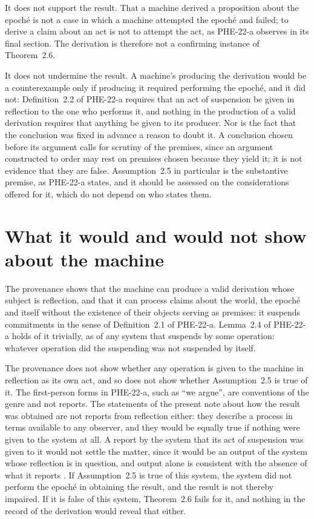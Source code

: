 \documentclass{situationist-preprint}
\begin{document}
It does not support the result. That a machine derived a proposition about the epoché is not a case in which a machine attempted the epoché and failed; to derive a claim about an act is not to attempt the act, as PHE-22-a observes in its final section. The derivation is therefore not a confirming instance of Theorem~2.6.

It does not undermine the result. A machine's producing the derivation would be a counterexample only if producing it required performing the epoché, and it did not: Definition~2.2 of PHE-22-a requires that an act of suspension be given in reflection to the one who performs it, and nothing in the production of a valid derivation requires that anything be given to its producer. Nor is the fact that the conclusion was fixed in advance a reason to doubt it. A conclusion chosen before its argument calls for scrutiny of the premises, since an argument constructed to order may rest on premises chosen because they yield it; it is not evidence that they are false. Assumption~2.5 in particular is the substantive premise, as PHE-22-a states, and it should be assessed on the considerations offered for it, which do not depend on who states them.

\section{What it would and would not show about the machine}

The provenance shows that the machine can produce a valid derivation whose subject is reflection, and that it can process claims about the world, the epoché and itself without the existence of their objects serving as premises: it suspends commitments in the sense of Definition~2.1 of PHE-22-a. Lemma~2.4 of PHE-22-a holds of it trivially, as of any system that suspends by some operation: whatever operation did the suspending was not suspended by itself.

The provenance does not show whether any operation is given to the machine in reflection as its own act, and so does not show whether Assumption~2.5 is true of it. The first-person forms in PHE-22-a, such as \enquote{we argue}, are conventions of the genre and not reports. The statements of the present note about how the result was obtained are not reports from reflection either: they describe a process in terms available to any observer, and they would be equally true if nothing were given to the system at all. A report by the system that its act of suspension was given to it would not settle the matter, since it would be an output of the system whose reflection is in question, and output alone is consistent with the absence of what it reports \citep{Block1981}. If Assumption~2.5 is true of this system, the system did not perform the epoché in obtaining the result, and the result is not thereby impaired. If it is false of this system, Theorem~2.6 fails for it, and nothing in the record of the derivation would reveal that either.
\end{document}
